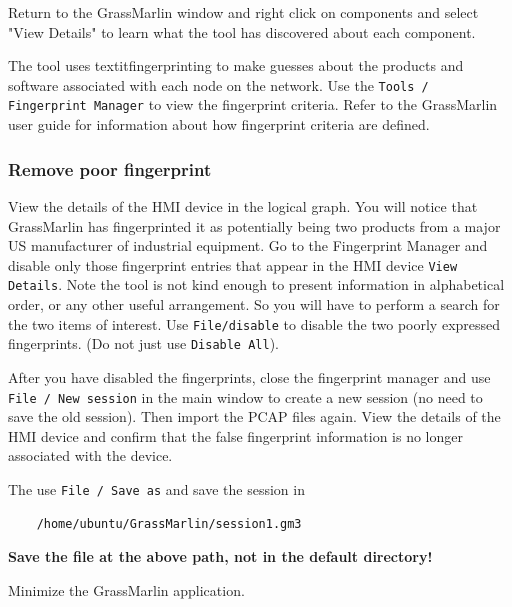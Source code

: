 Return to the GrassMarlin window and right click on components and select "View Details" to learn what the tool 
has discovered about each component.

The tool uses textit{fingerprinting} to make guesses about the products and software associated with each node on the
network.  Use the {\tt Tools / Fingerprint Manager} to view the fingerprint criteria.  Refer to the GrassMarlin user guide
for information about how fingerprint criteria are defined.

\subsubsection{Remove poor fingerprint}
View the details of the HMI device in the logical graph.  You will notice that GrassMarlin has fingerprinted it as potentially
being two products from a major US manufacturer of industrial equipment.  Go to the Fingerprint Manager and disable only those 
fingerprint entries that appear in the HMI device {\tt View Details}.  Note the tool is not kind enough to present information in
alphabetical order, or any other useful arrangement.  So you will have to perform a search for the two items of interest.
Use {\tt File/disable} to disable the two poorly expressed fingerprints.  (Do not just use {\tt Disable All}).

After you have disabled the fingerprints, close the fingerprint manager and use {\tt File / New session} in the main window
to create a new session (no need to save the old session).  Then import the PCAP files again.  View the details of the HMI device
and confirm that the false fingerprint information is no longer associated with the device.

The use {\tt File / Save as} and save the session in
\begin{verbatim}
    /home/ubuntu/GrassMarlin/session1.gm3
\end{verbatim}
\noindent \textbf{Save the file at the above path, not in the default directory!}


Minimize the GrassMarlin application.

